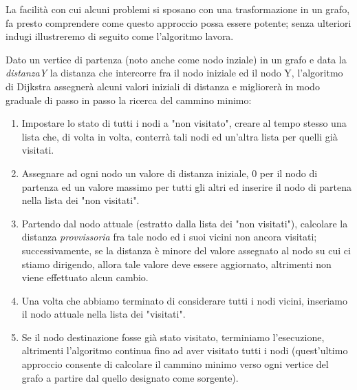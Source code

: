 La facilit\`a con cui alcuni problemi si sposano con una trasformazione in un grafo, fa presto comprendere come questo approccio possa essere potente; senza ulteriori indugi illustreremo di seguito come l'algoritmo lavora.
\vspace{3mm}

Dato un vertice di partenza (noto anche come nodo inziale) in un grafo e data la \textit{distanzaY} la distanza che intercorre fra il nodo iniziale ed il nodo Y, l'algoritmo di Dijkstra assegner\`a alcuni valori iniziali di distanza e migliorer\`a in modo graduale di passo in passo la ricerca del cammino minimo:
\begin{enumerate}
    \item Impostare lo stato di tutti i nodi a "non visitato", creare al tempo stesso una lista che, di volta in volta, conterr\`a tali nodi ed un'altra lista per quelli gi\`a visitati. 
    \item Assegnare ad ogni nodo un valore di distanza iniziale, $0$ per il nodo di partenza ed un valore massimo per tutti gli altri ed inserire il nodo di partena nella lista dei "non visitati".
    \item Partendo dal nodo attuale (estratto dalla lista dei "non visitati"), calcolare la distanza \textit{provvissoria} fra tale nodo ed i suoi vicini non ancora visitati; successivamente, se la distanza \`e minore del valore assegnato al nodo su cui ci stiamo dirigendo, allora tale valore deve essere aggiornato, altrimenti non viene effettuato alcun cambio.
    \item Una volta che abbiamo terminato di considerare tutti i nodi vicini, inseriamo il nodo attuale nella lista dei "visitati".
    \item Se il nodo destinazione fosse gi\`a stato visitato, terminiamo l'esecuzione, altrimenti l'algoritmo continua fino ad aver visitato tutti i nodi (quest'ultimo approccio consente di calcolare il cammino minimo verso ogni vertice del grafo a partire dal quello designato come sorgente).
\end{enumerate}

